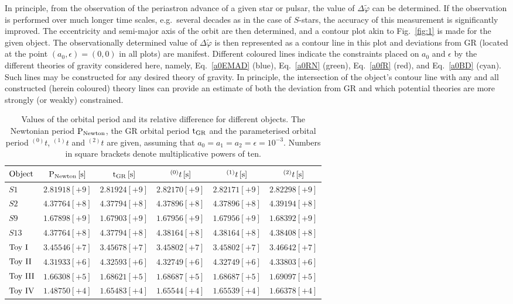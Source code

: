 \documentclass[a4paper,aps,twocolumn,showpacs,showkeys,nofootinbib,preprintnumbers,superscriptaddress,amsmath,amssymb,amsfonts]{revtex4-1}
\begin{document}
In principle, from the observation of the periastron advance of a given star or pulsar,
the value of $\Delta \widetilde{\varphi}$ can be determined.
If the observation is performed over much longer time scales, e.g.~several decades
as in the case of $S$-stars, the accuracy of this measurement is significantly
improved.
The eccentricity and semi-major axis of the orbit are then determined,
and a contour plot akin to Fig.~\ref{fig:1} is made for the given object.
The observationally determined value of $\Delta \widetilde{\varphi}$ is then represented
as a contour line in this plot and deviations from GR 
(located at the point $(a_{0},\epsilon)=(0,0)$ in all plots) are manifest.
Different coloured lines indicate the constraints placed on $a_0$ and $\epsilon$ by the
different theories of gravity considered here, namely, Eq.~\eqref{a0EMAD}
(blue), Eq.~\eqref{a0RN} (green), Eq.~\eqref{a0fR} (red),
and Eq.~\eqref{a0BD} (cyan). 
Such lines may be constructed for any desired theory of gravity.
In principle, the intersection of the object's contour line with
any and all constructed (herein coloured) theory lines can provide
an estimate of both the deviation from GR and which potential
theories are more strongly (or weakly) constrained.
%
\begin{table*} 
\begin{center}
\caption{Values of the orbital period and its relative difference for
different objects. The Newtonian period ${\rm P_{Newton}}$, the GR
orbital period $\rm t_{GR}$ and the parameterised orbital period
${}^{(0)}t$, ${}^{(1)}t$ and ${}^{(2)}t$ are given, assuming that
$a_0=a_1=a_2=\epsilon=10^{-3}$. 
Numbers in square brackets denote multiplicative powers of ten.
}
\label{tab:2}
\begin{tabular}{lccccc}
\hline\hline
${\rm Object}$ & ${\rm P_{Newton} \, [s]}$ & ${\rm t_{GR} \, [s]}$ & 
${}^{(0)}t \, {\rm[s]}$ & ${}^{(1)}t \, {\rm[s]}$ & ${}^{(2)}t \, {\rm[s]}$ \\
\hline
${S1}$ & $2.81918 [+9]$ & $2.81924 [+9]$ & $2.82170 [+9]$ &
$2.82171 [+9]$ & $2.82298 [+9]$ \\
\hline
${S2}$ & $4.37764 [+8]$ & $4.37794 [+8]$ & $4.37896 [+8]$ &
$4.37896 [+8]$ & $4.39194 [+8]$ \\
\hline
${S9}$ & $1.67898 [+9]$& $1.67903 [+9]$ & $1.67956 [+9]$ &
$1.67956 [+9]$ & $1.68392 [+9]$ \\
\hline
${S13}$ & $4.37764 [+8]$ & $4.37794 [+8]$ & $4.38164 [+8]$ &
$4.38164 [+8]$ & $4.38408 [+8]$ \\
\hline
${\rm Toy \ I}$ & $3.45546 [+7]$ & $3.45678 [+7]$ & $3.45802 [+7]$ &
$3.45802 [+7]$ & $3.46642 [+7]$ \\ 
\hline
${\rm Toy \ II}$ & $4.31933 [+6]$ & $4.32593 [+6]$ & $4.32749 [+6]$ &
$4.32749 [+6]$ & $4.33803 [+6]$ \\
\hline
${\rm Toy \ III}$ & $1.66308 [+5]$ & $1.68621 [+5]$ & $1.68687 [+5]$ & $1.68687 [+5]$ & $1.69097 [+5]$ \\
\hline
${\rm Toy \ IV}$ & $1.48750 [+4]$ & $1.65483 [+4]$ & $1.65544 [+4]$ & $1.65539 [+4]$ & $1.66378 [+4]$ \\
\hline\hline
\end{tabular}
\end{center}
\end{table*} 
\end{document}
